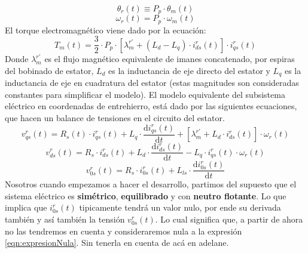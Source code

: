 \documentclass[10pt]{article}
\begin{document}
\begin{enumerate}
\begin{itemize}
\begin{equation}
		\end{equation}
		\\
		\begin{equation}
			\theta_{r} \left ( t \right ) \equiv P_{p} \cdot \theta_{m} \left ( t \right )
		\end{equation}
		\begin{equation}
			\omega_{r}\left ( t \right )=P_{p}\cdot \omega_{m}\left ( t \right )
		\end{equation}
		El torque electromagnético viene dado por la ecuación:
		\begin{equation}
			\label{sist:electromagnetico}
			T_{m}\left ( t \right )=\frac{3}{2} \cdot P_{p} \cdot \left [ \lambda_{m}^{r'}+\left ( L_{d}-L_{q} \right )\cdot i_{ds}^{r} \left ( t \right ) \right ] \cdot i_{qs}^{r}\left ( t \right )
		\end{equation}
		Donde $\lambda_{m}^{r'}$ es el flujo magnético equivalente de imanes concatenado, por espiras del bobinado de estator,
		$L_{d}$ es la inductancia de eje directo del estator y $L_{q}$ es la inductancia de eje en cuadratura del estator (estas magnitudes son consideradas constantes para simplificar el modelo).
		El modelo equivalente del subsistema eléctrico en coordenadas de entrehierro, está dado por las siguientes ecuaciones, que hacen un balance de tensiones en el circuito del estator.
		\begin{equation}
			\label{sist:electrico1}
			v_{qs}^{r}\left ( t \right )=R_{s}\left ( t \right )\cdot i_{qs}^{r}\left ( t \right )+L_{q}\cdot \frac{\mathrm{d} i_{qs}^{r}\left ( t \right )}{\mathrm{d} t}+\left [ \lambda_{m}^{r'}+L_{d}\cdot i_{ds}^{r}\left ( t \right ) \right ]\cdot \omega_{r}\left ( t \right )
		\end{equation}
		\begin{equation}
			\label{sist:electrico2}
			v_{ds}^{r}\left ( t \right )=R_{s}\cdot i_{ds}^{r}\left ( t \right )+L_{d}\cdot \frac{\mathrm{d} i_{ds}^{r}\left ( t \right )}{\mathrm{d} t}-L_{q}\cdot i_{qs}^{r}\left ( t \right )\cdot \omega_{r}\left ( t \right )
		\end{equation}
		\begin{equation}
			\label{eqn:expresionNula}
			v_{0s}^{r}\left ( t \right )=R_{s}\cdot i_{0s}^{r}\left ( t \right )+L_{ls}\cdot \frac{\mathrm{d} i_{0s}^{r}\left ( t \right )}{\mathrm{d} t}
		\end{equation}
		Nosotros cuando empezamos a hacer el desarrollo, partimos del supuesto que el sistema eléctrico es \textbf{simétrico}, \textbf{equilibrado} y con \textbf{neutro flotante}. Lo que implica que $i_{0s}^{r}(t)$ tipicamente tendrá un valor nulo, por ende su derivada también y así también la tensión $v_{0s}^{r}(t)$.
		Lo cual significa que, a partir de ahora no las tendremos en cuenta y consideraremos nula a la expresión \ref{eqn:expresionNula}. Sin tenerla en cuenta de acá en adelane.
		

\end{itemize}
\end{enumerate}
\end{document}
